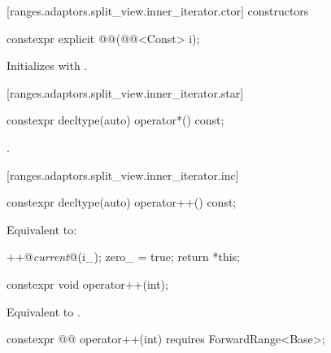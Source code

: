 [ranges.adaptors.split_view.inner_iterator.ctor]{ constructors}

%
\begin{itemdecl}
constexpr explicit @@(@@<Const> i);
\end{itemdecl}

\begin{itemdescr}
\pnum
\effects Initializes  with .
\end{itemdescr}

[ranges.adaptors.split_view.inner_iterator.star]{}

%
\begin{itemdecl}
constexpr decltype(auto) operator*() const;
\end{itemdecl}

\begin{itemdescr}
\pnum
\returns {}.
\end{itemdescr}

[ranges.adaptors.split_view.inner_iterator.inc]{}

%
\begin{itemdecl}
constexpr decltype(auto) operator++() const;
\end{itemdecl}

\begin{itemdescr}
\pnum
\effects Equivalent to:
\begin{codeblock}
++@\textit{current}@(i_);
zero_ = true;
return *this;
\end{codeblock}
\end{itemdescr}

%
\begin{itemdecl}
constexpr void operator++(int);
\end{itemdecl}

\begin{itemdescr}
\pnum
\effects Equivalent to .
\end{itemdescr}

%
\begin{itemdecl}
constexpr @@ operator++(int) requires ForwardRange<Base>;
\end{itemdecl}

